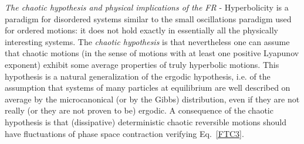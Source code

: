 \documentclass[pre,aps]{revtex4}
\newcommand{\ie}{i.e. }
\begin{document}
\vskip10pt

\noindent
{\it The chaotic hypothesis and physical implications of the FR} - 
Hyperbolicity is a paradigm 
for disordered systems similar to the
small oscillations paradigm used for ordered motions: it does not
hold exactly in essentially all the physically interesting
systems. The {\it chaotic hypothesis} \cite{Ga99,GC95a,GC95b,Ga04,Ru04}
is that nevertheless
one can assume that chaotic motions 
(in the sense of motions with at least one positive Lyapunov exponent) 
exhibit some average properties of truly
hyperbolic motions. This hypothesis is a natural generalization of 
the ergodic hypothesis,
\ie of the assumption that systems of many particles at equilibrium
are well 
described on average by the microcanonical (or by the Gibbs) 
distribution, even if they are not
really (or they are not proven to be) ergodic.
A consequence of the chaotic hypothesis is that
(dissipative) deterministic chaotic reversible 
motions
should have fluctuations of phase space contraction verifying Eq.~\ref{FTC3}.
\end{document}
